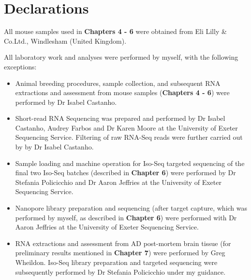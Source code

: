\chapter*{Declarations}

All mouse samples used in \textbf{Chapters 4 - 6}  were obtained from Eli Lilly \& Co.Ltd., Windlesham (United Kingdom). 

All laboratory work and analyses were performed by myself, with the following exceptions:
\begin{itemize}
	\item Animal breeding procedures, sample collection, and subsequent RNA extractions and assessment from mouse samples (\textbf{Chapters 4 - 6}) were performed by Dr Isabel Castanho.
	\item Short-read RNA Sequencing was prepared and performed by Dr Isabel Castanho, Audrey Farbos and Dr Karen Moore at the University of Exeter Sequencing Service. Filtering of raw RNA-Seq reads were further carried out by by Dr Isabel Castanho.
	\item Sample loading and machine operation for Iso-Seq targeted sequencing of the final two Iso-Seq batches (described in \textbf{Chapter 6}) were performed by Dr Stefania Policicchio and Dr Aaron Jeffries at the University of Exeter Sequencing Service.  
	\item Nanopore library preparation and sequencing (after target capture, which was performed by myself, as described in \textbf{Chapter 6}) were performed with Dr Aaron Jeffries at the University of Exeter Sequencing Service. 	
	\item RNA extractions and assessment from AD post-mortem brain tissue (for preliminary results mentioned in \textbf{Chapter 7}) were performed by Greg Wheildon. Iso-Seq library preparation and targeted sequencing were subsequently performed by Dr Stefania Policicchio under my guidance.
\end{itemize}